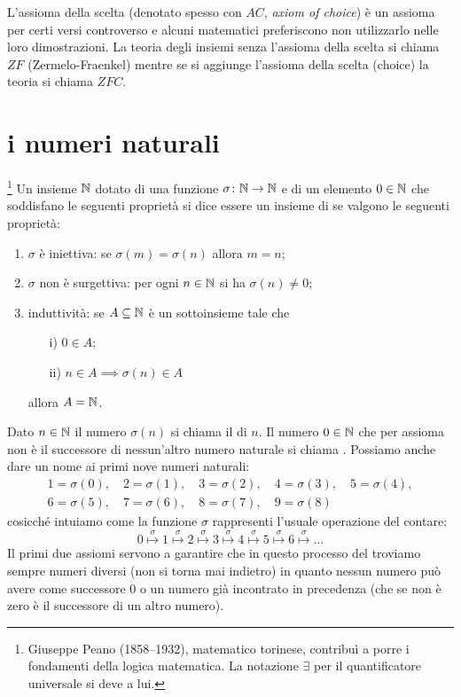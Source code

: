 L'assioma della scelta (denotato spesso con $AC$, \emph{axiom of choice})
è un assioma per certi versi controverso
e alcuni matematici preferiscono non utilizzarlo nelle loro dimostrazioni.
La teoria degli insiemi senza l'assioma della scelta 
si chiama $ZF$ (Zermelo-Fraenkel) mentre 
se si aggiunge l'assioma della scelta (choice) la teoria si chiama 
$ZFC$.

\section{i numeri naturali}

\begin{definition}
  \footnote{%
  Giuseppe Peano (1858--1932), matematico torinese, contribuì a porre 
  i fondamenti della logica matematica. 
  La notazione $\exists$ per il quantificatore universale si deve a lui.
  }%
  Un insieme $\mathbb N$ dotato di una 
  funzione $\sigma\colon\mathbb N\to\mathbb N$ e di un elemento $0\in \mathbb N$ che soddisfano
  le seguenti proprietà si dice essere un insieme di 
   se valgono le seguenti proprietà:
  \begin{enumerate}
  \item $\sigma$ è iniettiva: se $\sigma(m) =\sigma(n)$ allora $m=n$;
  \item $\sigma$ non è surgettiva: per ogni $n\in \mathbb N$ si ha $\sigma(n)\neq 0$;
  \item induttività: 
  se $A\subseteq \mathbb N$ è un sottoinsieme tale che 
  \begin{enumerate}
    \item[i)] $0\in A$;
    \item[ii)] $n\in A \implies \sigma(n)\in A$
  \end{enumerate}
  allora $A=\mathbb N$.
\end{enumerate}
\end{definition}

Dato $n\in \mathbb N$ il numero $\sigma(n)$ si chiama il  di $n$.
Il numero $0\in \mathbb N$ che per assioma non è il successore di nessun'altro 
numero naturale si chiama . 
Possiamo anche dare un nome ai primi 
nove numeri naturali:
\begin{gather*}
 1 = \sigma(0),\quad  
 2 = \sigma(1),\quad
 3 = \sigma(2),\quad 
 4 = \sigma(3),\quad
 5 = \sigma(4),\\ 
 6 = \sigma(5),\quad 
 7 = \sigma(6),\quad 
 8 = \sigma(7),\quad 
 9 = \sigma(8)
\end{gather*}
 cosicché intuiamo come la funzione $\sigma$ rappresenti 
 l'usuale operazione del contare:
 \[
 0 \stackrel\sigma\mapsto 1 \stackrel\sigma\mapsto 2 \stackrel\sigma\mapsto 
 3 \stackrel\sigma\mapsto 4 \stackrel\sigma\mapsto 5 \stackrel\sigma\mapsto 
 6 \stackrel\sigma\mapsto \dots  
 \]
Il primi due assiomi servono a garantire che in questo processo del 
troviamo sempre numeri diversi (non si torna mai indietro) in quanto nessun numero 
può avere come successore $0$ o un numero già incontrato in precedenza (che 
se non è zero è il successore di un altro numero).


